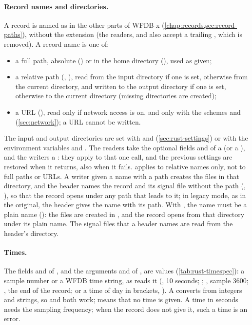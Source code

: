 \paragraph{Record names and directories.} A record is named as in the other parts of
WFDB-x (\cref{chap:records,sec:record-paths}), without the  extension (the
readers,  and  also accept a trailing
, which is removed). A record name is one of:
\begin{itemize}
\item a full path, absolute () or in the home directory
  (), used as given;
\item a relative path (, ), read from the input directory
  if one is set, otherwise from the current directory, and written to the output
  directory if one is set, otherwise to the current directory (missing directories are
  created);
\item a URL (), read only if network
  access is on, and only with the schemes  and 
  (\cref{sec:network}); a URL cannot be written.
\end{itemize}
The input and output directories are set with  and
 (\cref{sec:rust-settings}) or with the environment
variables  and . The readers take the
optional fields  and  of a  (or a
), and the writers a : they apply to that one call, and
the previous settings are restored when it returns, also when it fails.
 applies to relative names only, not to full paths or URLs. A writer
given a name with a path creates the files in that directory, and the header names the
record and its signal file without the path (, ), so that the
record opens under any path that leads to it; in legacy mode, as in the original, the
header gives the name with its path. With , the name must be a plain name
(): the files are created in , and the record opens from that
directory under its plain name. The signal files that a header names are read from the
header's directory.

\paragraph{Times.} The fields  and  of , and the
arguments  and  of , are
 values (\cref{tab:rust-timespec}): a sample number or a WFDB time
string, as  reads it (, 10 seconds; ;
, sample 3600; , the end of the record; or a time of day in
brackets, ). A  converts from integers and strings, so
 and  both work;  means that
no time is given. A time in seconds needs the sampling frequency; when the record does
not give it, such a time is an error.

